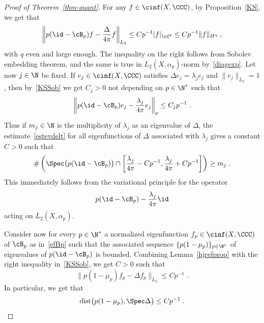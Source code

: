 \begin{proof}[Proof of Theorem~\ref{thm-quant}]
For any $f\in\cinf(X,\CCC)$, by Proposition~\ref{KS}, we get that
\begin{equation}\label{KSSob}
\left\|p(\id-\cB_p)f-\frac{\Delta}{4\pi}f\right\|_{L_2}
\leq Cp^{-1}|f|_{\cC^{4}}
\leq Cp^{-1}\|f\|_{H^{q}}\;,
\end{equation}
with $q$ even and large enough. The inequality on the right follows from Sobolev embedding theorem, and the same is true in $L_2(X,\alpha_p)$-norm by~\eqref{diagexp}. Let now $j\in\N$ be fixed. If $e_j\in\cinf(X,\CCC)$ satisfies $\Delta e_j=\lambda_j e_j$ and $\|e_j\|_{L_2}=1$, then by~\eqref{KSSob} we get $C_j>0$ not depending on $p\in\N^*$ such that
\begin{equation}\label{estevdelt}
\left\|p(\id-\cB_p)e_j-\frac{\lambda_j}{4\pi}e_j\right\| _p\leq C_j p^{-1}\;.
\end{equation}
Thus if $m_j\in\N$ is the multiplicity of $\lambda_j$ as an eigenvalue of $\Delta$, the estimate~\eqref{estevdelt} for all eigenfunctions of $\Delta$ associated with $\lambda_j$ gives a constant $C>0$ such that
\begin{equation}\label{spec>}
\#\left(\Spec\big(p(\id-\cB_p)\big)\cap\left[\frac{\lambda_j}{4\pi}-Cp^{-1},\frac{\lambda_j}{4\pi}+Cp^{-1}\right]\right)
\geq m_j\;.
\end{equation}
This immediately follows from the variational principle for the operator
\[
p(\id-\cB_p)-\frac{\lambda_j}{4\pi}\id
\]
acting on $L_2(X,\alpha_p)$.


Consider now for every $p\in\N^*$ a normalized eigenfunction $f_p\in\cinf(X,\CCC)$ of $\cB_p$ as in~\eqref{efBp} such that the associated sequence $\{p(1-\mu_p)\}_{p\in\N^*}$ of eigenvalues of $p(\id-\cB_p)$ is bounded. Combining Lemma~\ref{hjrefprop} with the right inequality in~\eqref{KSSob}, we get $C>0$ such that
\begin{equation}\label{specinv>}
\big\|p(1-\mu_p)f_p-\Delta f_p\big\|_{L_2}\leq Cp^{-1}\;.
\end{equation}
In particular, we get that
\begin{equation}\label{eq-spec-est}
\textup{dist}\big(p(1-\mu_p),\Spec\Delta\big)\leq Cp^{-1}\;.
\end{equation}


\end{proof}
